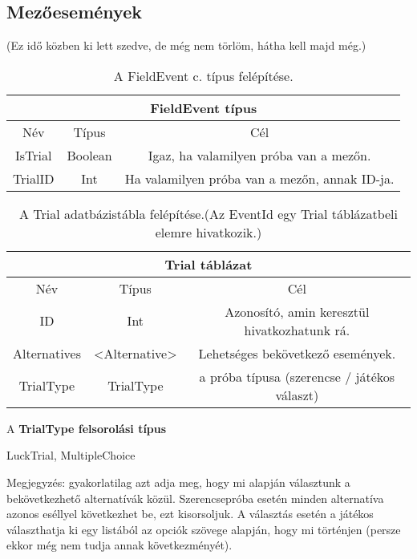 \subsection{Mezőesemények}

(Ez idő közben ki lett szedve, de még nem törlöm, hátha kell majd még.)
\begin{table}[H]
	\centering
	\begin{tabular}{ |c|c|c| }
		\hline
		\multicolumn{3}{|c|}{FieldEvent típus}\\
		\hline
		Név & Típus & Cél \\
		\hline
		IsTrial  & Boolean  & Igaz, ha valamilyen próba van a mezőn.\\
		\hline
		TrialID & Int & Ha valamilyen próba van a mezőn, annak ID-ja.\\
		\hline
	\end{tabular}
	\caption[FieldEvent típus]{A FieldEvent c. típus felépítése.}
	\label{tab:field}
\end{table}


\begin{table}[htb]
	\centering
	\begin{tabular}{ |c|c|c| }
		\hline
		\multicolumn{3}{|c|}{Trial táblázat}\\
		\hline
		Név & Típus & Cél \\
		\hline
		ID & Int & Azonosító, amin keresztül hivatkozhatunk rá. \\
		\hline
		Alternatives & <Alternative> & Lehetséges bekövetkező események.\\
		\hline
		TrialType & TrialType & a próba típusa (szerencse / játékos választ)\\
		\hline
	\end{tabular}
	\caption[Trial adatbázistába]{A Trial adatbázistábla felépítése.(Az EventId egy Trial táblázatbeli elemre hivatkozik.)}
	\label{tab:trial}
\end{table}

A \textbf{TrialType felsorolási típus}
\begin{compactitem}
	\item LuckTrial, MultipleChoice
	\item Megjegyzés: gyakorlatilag azt adja meg, hogy mi alapján választunk a bekövetkezhető alternatívák közül. Szerencsepróba esetén minden alternatíva azonos eséllyel következhet be, ezt kisorsoljuk. A választás esetén a játékos választhatja ki egy listából az opciók szövege alapján, hogy mi történjen (persze ekkor még nem tudja annak következményét).
\end{compactitem}


